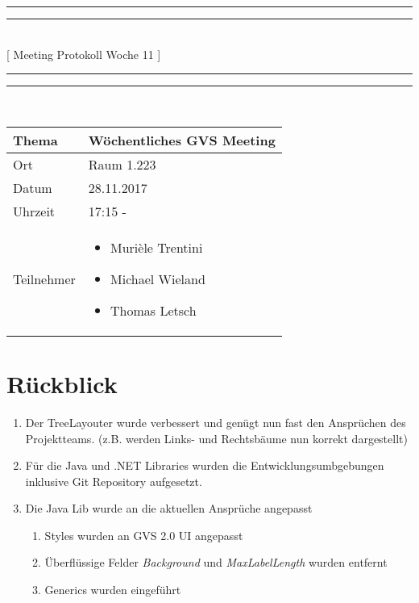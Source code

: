 \documentclass[11pt, a4paper,oneside]{scrartcl}
\begin{document}
	\centering
	\rule{\textwidth}{1.6pt}\vspace*{-\baselineskip}\vspace*{2pt} %
	\rule{\textwidth}{0.4pt}\\[\baselineskip] %
	{\LARGE [ Meeting Protokoll Woche 11 ]}\\[0.2\baselineskip] %
	\rule{\textwidth}{0.4pt}\vspace*{-\baselineskip}\vspace{3.2pt} %
	\rule{\textwidth}{1.6pt}\\[2\baselineskip] %
	
	\begin{tabu} to \linewidth {l X }
		\toprule
		\textbf{Thema} & \textbf{Wöchentliches GVS Meeting} \\
		\midrule
		Ort & Raum 1.223 \\
		Datum & 28.11.2017  \\
		Uhrzeit &  17:15 -  \\
		Teilnehmer & 
		\begin{minipage}[t]{\textwidth}
			\begin{itemize}
				\item Murièle Trentini
				\item Michael Wieland
				\item Thomas Letsch
			\end{itemize}
		\end{minipage}
		\\
		\bottomrule
	\end{tabu}
	
	
	\section{Rückblick}
	\begin{enumerate}
		\item Der TreeLayouter wurde verbessert und genügt nun fast den Ansprüchen des Projektteams. (z.B. werden Links- und Rechtsbäume nun korrekt dargestellt)
		\item Für die Java und .NET Libraries wurden die Entwicklungsumbgebungen inklusive Git Repository aufgesetzt.
		\item Die Java Lib wurde an die aktuellen Ansprüche angepasst
		\begin{enumerate}
			\item Styles wurden an GVS 2.0 UI angepasst
			\item Überflüssige Felder \textit{Background} und \textit{MaxLabelLength} wurden entfernt
			\item Generics wurden eingeführt
		\end{enumerate}
	\end{enumerate}
	
\end{document}
